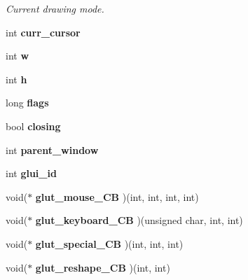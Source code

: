 \begin{DoxyCompactItemize}
\begin{DoxyCompactList}\small\item\em Current drawing mode. \end{DoxyCompactList}\item 
\hypertarget{class_g_l_u_i___main_a661d825dbff47caee733683f557491cf}{int {\bfseries curr\+\_\+cursor}}\label{class_g_l_u_i___main_a661d825dbff47caee733683f557491cf}

\item 
\hypertarget{class_g_l_u_i___main_acee19f928a4837310f654431fda7cc1a}{int {\bfseries w}}\label{class_g_l_u_i___main_acee19f928a4837310f654431fda7cc1a}

\item 
\hypertarget{class_g_l_u_i___main_a7c5cd9db296247eceb52c2aa84448e0f}{int {\bfseries h}}\label{class_g_l_u_i___main_a7c5cd9db296247eceb52c2aa84448e0f}

\item 
\hypertarget{class_g_l_u_i___main_ac3fbf169a16afe8e09cebf714f4aee65}{long {\bfseries flags}}\label{class_g_l_u_i___main_ac3fbf169a16afe8e09cebf714f4aee65}

\item 
\hypertarget{class_g_l_u_i___main_a5392e305249f1baf91402460b7c14f10}{bool {\bfseries closing}}\label{class_g_l_u_i___main_a5392e305249f1baf91402460b7c14f10}

\item 
\hypertarget{class_g_l_u_i___main_a70e6e1ec266281f272954fcc42f85087}{int {\bfseries parent\+\_\+window}}\label{class_g_l_u_i___main_a70e6e1ec266281f272954fcc42f85087}

\item 
\hypertarget{class_g_l_u_i___main_a6f8d24f29be85514e1abe05f4f33eb17}{int {\bfseries glui\+\_\+id}}\label{class_g_l_u_i___main_a6f8d24f29be85514e1abe05f4f33eb17}

\item 
\hypertarget{class_g_l_u_i___main_a8a4d3dfa4aac5817297071f05d808afb}{void($\ast$ {\bfseries glut\+\_\+mouse\+\_\+\+C\+B} )(int, int, int, int)}\label{class_g_l_u_i___main_a8a4d3dfa4aac5817297071f05d808afb}

\item 
\hypertarget{class_g_l_u_i___main_a96d36ca6359fb96bca292a9ff7b1d53f}{void($\ast$ {\bfseries glut\+\_\+keyboard\+\_\+\+C\+B} )(unsigned char, int, int)}\label{class_g_l_u_i___main_a96d36ca6359fb96bca292a9ff7b1d53f}

\item 
\hypertarget{class_g_l_u_i___main_aa50303a909f39a7b28cfdf076cc848a4}{void($\ast$ {\bfseries glut\+\_\+special\+\_\+\+C\+B} )(int, int, int)}\label{class_g_l_u_i___main_aa50303a909f39a7b28cfdf076cc848a4}

\item 
\hypertarget{class_g_l_u_i___main_a93bdf0d34e2f3494dce800ba16da4ec2}{void($\ast$ {\bfseries glut\+\_\+reshape\+\_\+\+C\+B} )(int, int)}\label{class_g_l_u_i___main_a93bdf0d34e2f3494dce800ba16da4ec2}

\end{DoxyCompactItemize}
